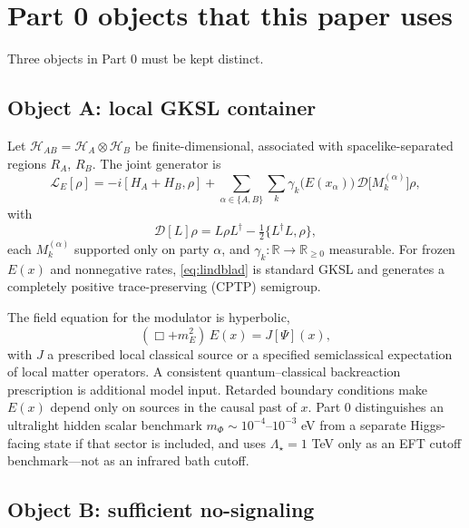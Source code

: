 \documentclass[11pt]{article}
\theoremstyle{definition}
\theoremstyle{plain}
\begin{document}
\section{Part 0 objects that this paper uses}\label{sec:objects}

Three objects in Part 0 must be kept distinct.\cite{part0}

\subsection{Object A: local GKSL container}

Let $\mathcal{H}_{AB} = \mathcal{H}_A \otimes \mathcal{H}_B$ be finite-dimensional, associated with
spacelike-separated regions $R_A$, $R_B$. The joint generator is
\begin{equation}
\mathcal{L}_E[\rho] = -i[ H_A + H_B, \rho] + \sum_{\alpha\in\{A,B\}}\sum_k \gamma_k\big( E(x_\alpha) \big)\, \mathcal{D}\big[ M_k^{(\alpha)} \big] \rho,
\label{eq:lindblad}
\end{equation}
with
\begin{equation}
\mathcal{D}[L]\rho = L\rho L^\dagger - \tfrac{1}{2}\{L^\dagger L, \rho\},
\label{eq:diss}
\end{equation}
each $M_k^{(\alpha)}$ supported only on party $\alpha$, and $\gamma_k: \mathbb{R}\to \mathbb{R}_{\ge 0}$ measurable.
For frozen $E(x)$ and nonnegative rates, \eqref{eq:lindblad} is standard GKSL and generates a
completely positive trace-preserving (CPTP) semigroup.\cite{Lindblad, Gorini, Breuer}

The field equation for the modulator is hyperbolic,
\begin{equation}
(\Box + m_E^2)\, E(x) = J[\Psi](x),
\label{eq:field}
\end{equation}
with $J$ a prescribed local classical source or a specified semiclassical expectation of local matter
operators. A consistent quantum--classical backreaction prescription is additional model input.
Retarded boundary conditions make $E(x)$ depend only on sources in the causal past of $x$.
Part 0 distinguishes an ultralight hidden scalar benchmark $m_\Phi \sim 10^{-4}$--$10^{-3}$ eV from a
separate Higgs-facing state if that sector is included, and uses $\Lambda_\star = 1$ TeV only as an
EFT cutoff benchmark---not as an infrared bath cutoff.

\subsection{Object B: sufficient no-signaling}
\end{document}
